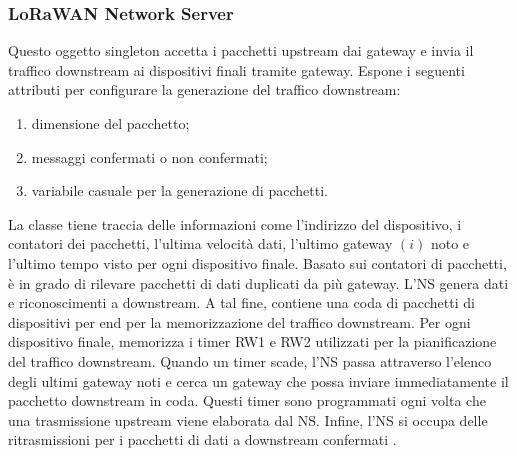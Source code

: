 \documentclass[a4paper]{report} %
\begin{document}
\subsubsection{LoRaWAN Network Server}
Questo oggetto singleton accetta i pacchetti upstream dai gateway e invia il traffico downstream ai dispositivi finali tramite gateway. Espone i seguenti attributi per configurare la generazione del traffico downstream:
\begin{enumerate}
\item dimensione del pacchetto;
\item messaggi confermati o non confermati;
\item variabile casuale per la generazione di pacchetti.
\end{enumerate}
La classe tiene traccia delle informazioni come l'indirizzo del dispositivo, i contatori dei pacchetti, l'ultima velocità dati, l'ultimo gateway $(i)$ noto e l'ultimo tempo visto per ogni dispositivo finale. Basato sui contatori di pacchetti, è in grado di rilevare pacchetti di dati duplicati da più gateway. L'NS genera dati e riconoscimenti a downstream. A tal fine, contiene una coda di pacchetti di dispositivi per end per la memorizzazione del traffico downstream. Per ogni dispositivo finale, memorizza i timer RW1 e RW2 utilizzati per la pianificazione del traffico downstream. Quando un timer scade, l'NS passa attraverso l'elenco degli ultimi gateway noti e cerca un gateway che possa inviare immediatamente il pacchetto downstream in coda. Questi timer sono programmati ogni volta che una trasmissione upstream viene elaborata dal NS. Infine, l'NS si occupa delle ritrasmissioni per i pacchetti di dati a downstream confermati \cite{art:rif.49}.
\end{document}
